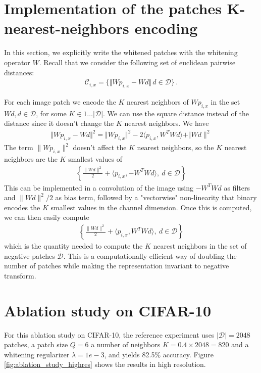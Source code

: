 \documentclass{article}
\begin{document}
\section{Implementation of the patches K-nearest-neighbors  encoding}

In this section, we explicitly write the whitened patches with the whitening operator $W$.
Recall that  we consider the following set of euclidean pairwise distances:
\begin{align*}\mathcal{C}_{i, x} =\{\Vert W p_{i, x} - W d \Vert\, d\in\mathcal{D} \}\,.\end{align*}

For each image patch we encode the $K$ nearest neighbors of $W p_{i,x}$ in the set $Wd, d \in \mathcal{D}$, for some $ K \in 1 \ldots|\mathcal{D}| $.
We can use the square distance instead of the distance since it doesn't change the $K$ nearest neighbors.
We have 
\begin{align*}
    \Vert Wp_{i,x} - Wd \Vert^2 = \Vert Wp_{i,x} \Vert^2 - 2 \langle p_{i,x}, W^T W d \rangle + \Vert Wd\|^2
\end{align*}
The term $\|Wp_{i,x}\|^2$ doesn't affect the $K$ nearest neighbors, so the $K$ nearest neighbors are the $K$ smallest values of
\begin{align*}
        \left \lbrace \frac{\|Wd \|^2}{2} + \langle p_{i,x}, -W^T W d \rangle, \ d \in \mathcal{D} \right \rbrace
\end{align*}
This can be implemented in a convolution of the image using $-W^T W d$ as filters and $\|Wd \|^2 / 2$ as bias term, followed by a "vectorwise" non-linearity that binary encodes the $K$ smallest values in the channel dimension.
Once this is computed, we can then easily compute 
\begin{align*}
        \left \lbrace \frac{\|Wd \|^2}{2} + \langle p_{i,x}, W^T W d \rangle, \ d \in \mathcal{D} \right \rbrace
\end{align*}
which is the quantity needed to compute the $K$ nearest neighbors in the set of negative patches $\overline{\mathcal{D}}$.
This is a computationally efficient way of doubling the number of patches while making the representation invariant to negative transform.


\section{Ablation study on CIFAR-10}

For this ablation study on CIFAR-10, the reference experiment uses  $|\mathcal{D}|=2048$ patches, a patch size $Q=6$ a number of neighbors $K=0.4\times 2048 = 820$ and a whitening regularizer $\lambda=1e-3$, and yields 82.5\% accuracy.
Figure \ref{fig:ablation_study_highres} shows the results in high resolution.
\end{document}
